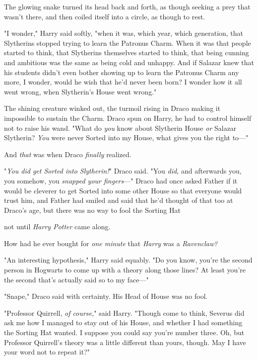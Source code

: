 The glowing snake turned its head back and forth, as though seeking a prey that
wasn't there, and then coiled itself into a circle, as though to rest.

"I wonder," Harry said softly, "when it was, which year, which generation, that
Slytherins stopped trying to learn the Patronus Charm. When it was that people
started to think, that Slytherins themselves started to think, that being
cunning and ambitious was the same as being cold and unhappy. And if Salazar
knew that his students didn't even bother showing up to learn the Patronus
Charm any more, I wonder, would he wish that he'd never been born? I wonder how
it all went wrong, when Slytherin's House went wrong."

The shining creature winked out, the turmoil rising in Draco making it
impossible to sustain the Charm. Draco spun on Harry, he had to control himself
not to raise his wand. "What do \emph{you} know about Slytherin House \emph{or}
Salazar Slytherin? \emph{You} were never Sorted into my House, what gives you
the right to\mbox{---}"

And \emph{that} was when Draco \emph{finally} realized.

"\emph{You did get Sorted into Slytherin!}" Draco said. "You \emph{did,} and
afterwards you, you somehow, you \emph{snapped your fingers}\mbox{---}" Draco had once
asked Father if it would be cleverer to get Sorted into some other House so
that everyone would trust him, and Father had smiled and said that he'd thought
of that too at Draco's age, but there was no way to fool the Sorting Hat{\el}

{\el} not until \emph{Harry Potter} came along.

How had he ever bought for \emph{one minute} that \emph{Harry} was a
\emph{Ravenclaw?}

"An interesting hypothesis," Harry said equably. "Do you know, you're the
second person in Hogwarts to come up with a theory along those lines? At least
you're the second that's actually said so to my face\mbox{---}"

"Snape," Draco said with certainty. His Head of House was no fool.

"Professor Quirrell, \emph{of course,}" said Harry. "Though come to think,
Severus did ask me how I managed to stay out of his House, and whether I had
something the Sorting Hat wanted. I suppose you could say you're number three.
Oh, but Professor Quirrell's theory was a little different than yours, though.
May I have your word not to repeat it?"

